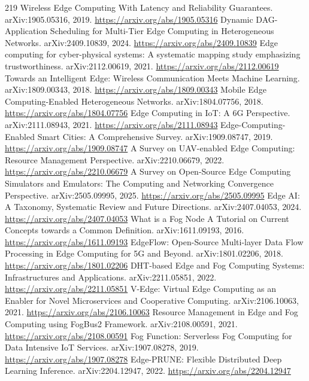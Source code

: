\documentclass[11pt]{article}
\begin{document}
\begin{thebibliography}{219}
 Wireless Edge Computing With Latency and Reliability Guarantees. arXiv:1905.05316, 2019. \url{https://arxiv.org/abs/1905.05316}
 Dynamic DAG-Application Scheduling for Multi-Tier Edge Computing in Heterogeneous Networks. arXiv:2409.10839, 2024. \url{https://arxiv.org/abs/2409.10839}
 Edge computing for cyber-physical systems: A systematic mapping study emphasizing trustworthiness. arXiv:2112.00619, 2021. \url{https://arxiv.org/abs/2112.00619}
 Towards an Intelligent Edge: Wireless Communication Meets Machine Learning. arXiv:1809.00343, 2018. \url{https://arxiv.org/abs/1809.00343}
 Mobile Edge Computing-Enabled Heterogeneous Networks. arXiv:1804.07756, 2018. \url{https://arxiv.org/abs/1804.07756}
 Edge Computing in IoT: A 6G Perspective. arXiv:2111.08943, 2021. \url{https://arxiv.org/abs/2111.08943}
 Edge-Computing-Enabled Smart Cities: A Comprehensive Survey. arXiv:1909.08747, 2019. \url{https://arxiv.org/abs/1909.08747}
 A Survey on UAV-enabled Edge Computing: Resource Management Perspective. arXiv:2210.06679, 2022. \url{https://arxiv.org/abs/2210.06679}
 A Survey on Open-Source Edge Computing Simulators and Emulators: The Computing and Networking Convergence Perspective. arXiv:2505.09995, 2025. \url{https://arxiv.org/abs/2505.09995}
 Edge AI: A Taxonomy, Systematic Review and Future Directions. arXiv:2407.04053, 2024. \url{https://arxiv.org/abs/2407.04053}
 What is a Fog Node A Tutorial on Current Concepts towards a Common Definition. arXiv:1611.09193, 2016. \url{https://arxiv.org/abs/1611.09193}
 EdgeFlow: Open-Source Multi-layer Data Flow Processing in Edge Computing for 5G and Beyond. arXiv:1801.02206, 2018. \url{https://arxiv.org/abs/1801.02206}
 DHT-based Edge and Fog Computing Systems: Infrastructures and Applications. arXiv:2211.05851, 2022. \url{https://arxiv.org/abs/2211.05851}
 V-Edge: Virtual Edge Computing as an Enabler for Novel Microservices and Cooperative Computing. arXiv:2106.10063, 2021. \url{https://arxiv.org/abs/2106.10063}
 Resource Management in Edge and Fog Computing using FogBus2 Framework. arXiv:2108.00591, 2021. \url{https://arxiv.org/abs/2108.00591}
 Fog Function: Serverless Fog Computing for Data Intensive IoT Services. arXiv:1907.08278, 2019. \url{https://arxiv.org/abs/1907.08278}
 Edge-PRUNE: Flexible Distributed Deep Learning Inference. arXiv:2204.12947, 2022. \url{https://arxiv.org/abs/2204.12947}

\end{thebibliography}
\end{document}
